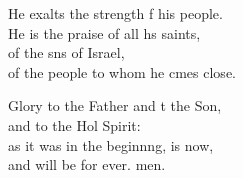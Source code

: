 \begin{psalmverse}
\begin{patverse}
He exalts the strength f his people.\Med\\
    He is the praise of all h\pointup{\i}s saints,\\
of the sns of Israel,\Med\\
    of the people to whom he cmes close.

Glory to the Father and t the Son,\Med\\
    and to the Hol Spirit:\\
as it was in the beginn\pointup{\i}ng, is now,\Med\\
    and will be for ever. men.
  \end{patverse}
\end{psalmverse}
